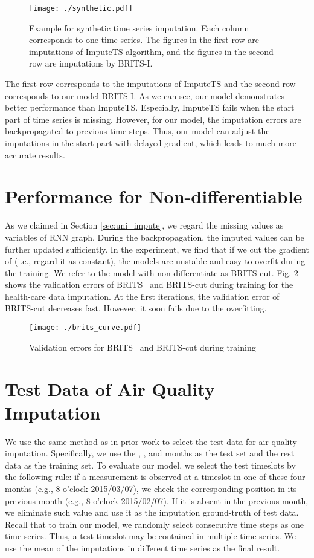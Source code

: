 \documentclass{article}
\newcommand{\britsi}{\xspace{BRITS-I}}
\newcommand{\brits}{\xspace{BRITS}}
\begin{document}
\begin{figure}[htbp]
\centering
\footnotesize
\texttt{[image: ./synthetic.pdf]}
\caption{Example for synthetic time series imputation. Each column corresponds to one time series. The figures in the first row are imputations of ImputeTS algorithm, and the figures in the second row are imputations by \britsi.}
\label{fig:synthetic_example}
\end{figure}

The first row corresponds to the imputations of ImputeTS and the second row corresponds to our model \britsi. As we can see, our model demonstrates better performance than ImputeTS. Especially, ImputeTS fails when the start part of time series is missing. However, for our model, the imputation errors are backpropagated to previous time steps. Thus, our model can adjust the imputations in the start part with delayed gradient, which leads to much more accurate results.



\section{Performance for Non-differentiable }
\label{appendix:cut}
As we claimed in Section \ref{sec:uni_impute}, we regard the missing values as variables of RNN graph. During the backpropagation, the imputed values can be further updated sufficiently. In the experiment, we find that if we cut the gradient of  (i.e., regard it as constant), the models are unstable and easy to overfit during the training. We refer to the model with non-differentiate  as \brits-cut.
Fig. \ref{fig:brits_curve} shows the validation errors of \brits~ and \brits-cut during training for the health-care data imputation. At the first  iterations,  the validation error of \brits-cut decreases fast. However, it soon fails due to the overfitting.

\begin{figure}[t] 
\centering
\texttt{[image: ./brits\_curve.pdf]} 
\caption{Validation errors for \brits~ and \brits-cut during training}
\label{fig:brits_curve} 
\end{figure} 

\section{Test Data of Air Quality Imputation}
\label{appendix:air}
We use the same method as in prior work \cite{yi2016st} to select the test data for air quality imputation. Specifically, we use the , ,  and  months as the test set and the rest data as the training set. To evaluate our model, we select the test timeslots by the following rule: if a measurement is observed at a timeslot in one of these four months (e.g., 8 o'clock 2015/03/07), we check the corresponding position in its previous month (e.g., 8 o'clock 2015/02/07). If it is absent in the previous month, we eliminate such value  and use it as the imputation ground-truth of test data.  Recall that to train our model, we randomly select consecutive  time steps as one time series. Thus, 
 a test timeslot may be contained in multiple time series. We use the mean of the imputations in different time series as the final result.
  
\end{document}
